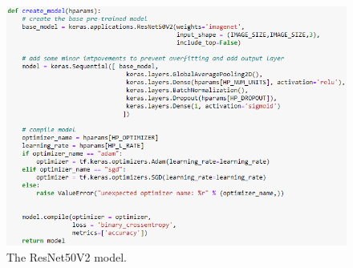 \begin{figure}[H]
    \centering
    \includegraphics[width=\textwidth]{figures/resnet-model.png}
    \caption{The ResNet50V2 model.}
    \label{fig:resnet-model}
\end{figure}

